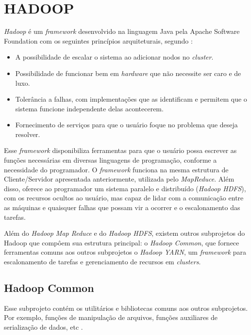 
\section{HADOOP} \label{sec:hadoop}

\textit{Hadoop} é um \textit{\gls{framework}} desenvolvido na linguagem Java pela Apache Software Foundation com os seguintes princípios arquiteturais, segundo \textcite{ImprovingNavarro18}:
\begin{itemize}
  \item A possibilidade de escalar o sistema ao adicionar nodos no \textit{cluster}.
  \item Possibilidade de funcionar bem em \textit{hardware} que não necessite ser caro e de luxo.
  \item Tolerância a falhas, com implementações que as identificam e permitem que o sistema funcione independente delas acontecerem.
  \item Fornecimento de serviços para que o usuário foque no problema que deseja resolver.
\end{itemize}

Esse \textit{\gls{framework}} disponibiliza ferramentas para que o usuário possa escrever as funções necessárias em diversas linguagens de programação, conforme a necessidade do programador. O \textit{\gls{framework}} funciona na mesma estrutura de Cliente/Servidor apresentada anteriormente, utilizada pelo \textit{MapReduce}. Além disso, oferece ao programador um sistema paralelo e distribuído (\textit{Hadoop HDFS}), com os recursos ocultos ao usuário, mas capaz de lidar com a comunicação entre as máquinas e quaisquer falhas que possam vir a ocorrer e o escalonamento das tarefas.

Além do \textit{Hadoop Map Reduce} e do \textit{Hadoop HDFS}, existem outros subprojetos do Hadoop que compôem sua estrutura principal: o \textit{Hadoop Common}, que fornece ferramentas comuns aos outros subprojetos  o \textit{Hadoop YARN}, um \textit{\gls{framework}} para escalonamento de tarefas e gerenciamento de recursos em \textit{clusters}.

\subsection{Hadoop Common}\label{ssec:hadoopcommon}

Esse subprojeto contém os utilitários e bibliotecas comuns aos outros subprojetos. Por exemplo, funções de manipulação de arquivos, funções auxiliares de serialização de dados, etc \cite{GoldmanApache12}.

